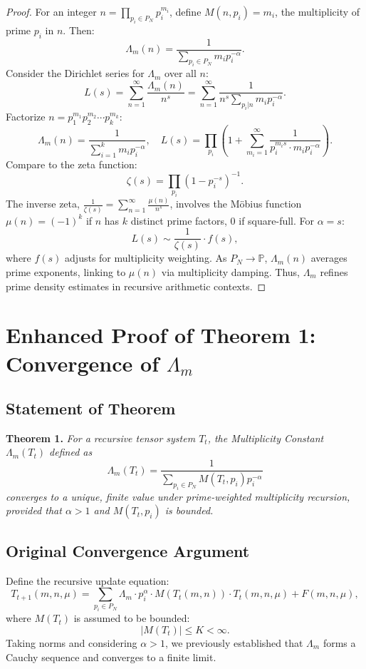 \documentclass{article}
\theoremstyle{plain}
\begin{document}
\begin{proof}
For an integer \( n = \prod_{p_i \in P_N} p_i^{m_i} \), define \( M(n, p_i) = m_i \), the multiplicity of prime \( p_i \) in \( n \). Then:
\[
\Lambda_m(n) = \frac{1}{\sum_{p_i \in P_N} m_i p_i^{-\alpha}}.
\]
Consider the Dirichlet series for \(\Lambda_m\) over all \( n \):
\[
L(s) = \sum_{n=1}^\infty \frac{\Lambda_m(n)}{n^s} = \sum_{n=1}^\infty \frac{1}{n^s \sum_{p_i | n} m_i p_i^{-\alpha}}.
\]
Factorize \( n = p_1^{m_1} p_2^{m_2} \cdots p_k^{m_k} \):
\[
\Lambda_m(n) = \frac{1}{\sum_{i=1}^k m_i p_i^{-\alpha}}, \quad L(s) = \prod_{p_i} \left( 1 + \sum_{m_i=1}^\infty \frac{1}{p_i^{m_i s} \cdot m_i p_i^{-\alpha}} \right).
\]
Compare to the zeta function:
\[
\zeta(s) = \prod_{p_i} \left( 1 - p_i^{-s} \right)^{-1}.
\]
The inverse zeta, \(\frac{1}{\zeta(s)} = \sum_{n=1}^\infty \frac{\mu(n)}{n^s}\), involves the M\"{o}bius function \(\mu(n) = (-1)^k\) if \( n \) has \( k \) distinct prime factors, 0 if square-full. For \(\alpha = s\):
\[
L(s) \sim \frac{1}{\zeta(s)} \cdot f(s),
\]
where \( f(s) \) adjusts for multiplicity weighting. As \( P_N \to \mathbb{P} \), \(\Lambda_m(n)\) averages prime exponents, linking to \(\mu(n)\) via multiplicity damping. Thus, \(\Lambda_m\) refines prime density estimates in recursive arithmetic contexts.
\end{proof}

\section{Enhanced Proof of Theorem 1: Convergence of \( \Lambda_m \)}

\subsection{Statement of Theorem}
\textbf{Theorem 1.} \textit{For a recursive tensor system \( T_t \), the Multiplicity Constant \( \Lambda_m(T_t) \) defined as}
\begin{equation}
    \Lambda_m(T_t) = \frac{1}{\sum_{p_i \in P_N} M(T_t, p_i) p_i^{-\alpha}}
\end{equation}
\textit{converges to a unique, finite value under prime-weighted multiplicity recursion, provided that \( \alpha > 1 \) and \( M(T_t, p_i) \) is bounded.}

\subsection{Original Convergence Argument}
Define the recursive update equation:
\begin{equation}
    T_{t+1}(m,n,\mu) = \sum_{p_i \in P_N} \Lambda_m \cdot p_i^\alpha \cdot M(T_t(m,n)) \cdot T_t(m,n,\mu) + F(m,n,\mu),
\end{equation}
where \( M(T_t) \) is assumed to be bounded:
\begin{equation}
    |M(T_t)| \leq K < \infty.
\end{equation}
Taking norms and considering \( \alpha > 1 \), we previously established that \( \Lambda_m \) forms a Cauchy sequence and converges to a finite limit.
\end{document}
